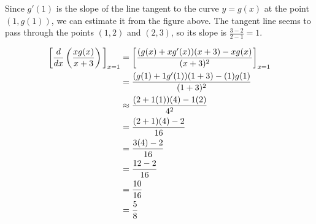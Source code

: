 \documentclass[nooutcomes]{ximera}
\begin{document}
\begin{problem}
\begin{freeResponse}
		Since $g'(1)$ is the slope of the line tangent to the curve $y=g(x)$ at the point $(1,g(1))$, we can estimate it from the figure above.  The tangent line seems to pass through the points $(1,2)$ and $(2,3)$, so its slope is $\frac{3-2}{2-1}=1$.

	\begin{align*}
	\bigg[  \frac{d}{dx} \left( \frac{xg(x)}{x+3}\right) \bigg]_{x=1}&= \bigg[ \frac{(g(x)+xg'(x))(x+3)-xg(x)}{(x+3)^2} \bigg]_{x=1}\\
	&=\frac{(g(1)+1g'(1))(1+3)-(1)g(1)}{(1+3)^2} \\
	& \approx \frac{(2+1(1))(4)-1(2)}{4^2}\\
	&=\frac{(2+1)(4)-2}{16}\\
	&= \frac{3(4)-2}{16}\\
	&= \frac{12-2}{16}\\
	&= \frac{10}{16}\\
	&=\frac{5}{8}
	\end{align*}



	\end{freeResponse}

\end{problem}	
	
	
			
			
\end{document}
